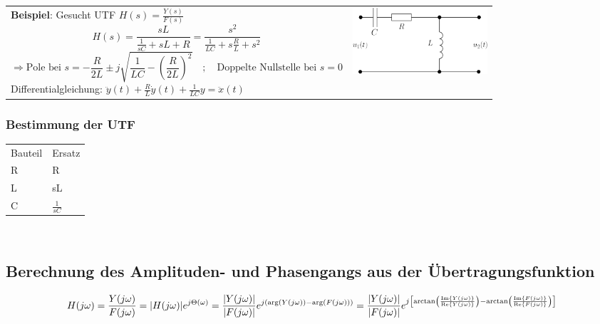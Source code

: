 \begin{tabular}{ll}
\parbox{13cm}{
	\textbf{Beispiel}: Gesucht UTF $H(s) = \frac{Y(s)}{F(s)}$ \\
	$$H(s) = \frac{sL}{\frac{1}{sC} + sL + R} = \frac{s^2}{\frac{1}{LC} + s
	\frac{R}{L} + s^2}$$\\
	$$\Longrightarrow \text{Pole bei } s = -\frac{R}{2L} \pm j
	\sqrt{\frac{1}{LC} - \left(\frac{R}{2L}\right)^2} \quad ; \quad \text{Doppelte
	Nullstelle bei } s = 0$$
	Differentialgleichung:    $ \ddot{y}(t)+
	\frac{R}{L}\dot{y}(t)+\frac{1}{LC}y=\ddot{x}(t)$}
	
	
	& \parbox{5cm}{
		\includegraphics[width=5cm]{./bilder/utf-beispiel.png}} \\
		
\end{tabular}


\subsubsection{Bestimmung der UTF}
\begin{tabular}{ll}
	Bauteil & Ersatz \\
	R & R\\
	L & sL\\
	C & $\frac{1}{sC}$ \\
\end{tabular}\\

\subsection{Berechnung des Amplituden- und Phasengangs aus der
Übertragungsfunktion}
\begin{equation}
	H(j \omega) = \frac{Y(j \omega)}{F(j \omega)} = |H(j\omega)| e^{j\Theta(\omega)} = 
	\frac{|Y(j \omega)|}{|F(j \omega)|} e^{j (\arg(Y(j \omega)) - 
	\arg(F(j\omega)))} =
	\frac{|Y(j \omega)|}{|F(j \omega)|} e^{j \left[\arctan \left(\frac{\operatorname{Im}\{Y(j
	\omega)\}}{\operatorname{Re}\{Y(j \omega)\}} \right) - \arctan \left(\frac{\operatorname{Im}\{F(j
	\omega)\}}{\operatorname{Re}\{F(j \omega)\}} \right)\right]} \nonumber \\
\end{equation}


